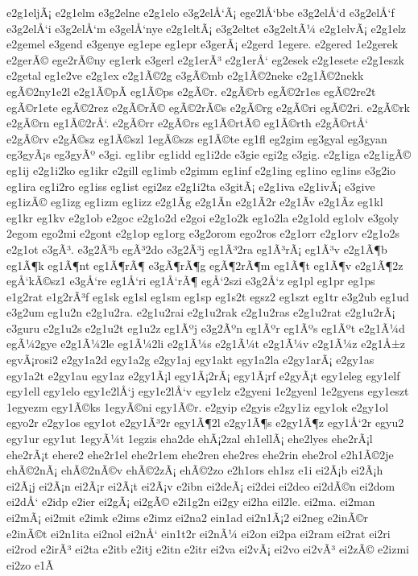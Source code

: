 {e2g1eljÃ¡
e2g1elm
e3g2elne
e2g1elo
e3g2elÅ‘Ã¡
ege2lÅ‘bbe
e3g2elÅ‘d
e3g2elÅ‘f
e3g2elÅ‘i
e3g2elÅ‘m
e3gelÅ‘nye
e2g1eltÃ¡
e3g2eltet
e3g2eltÃ¼
e2g1elvÃ¡
e2g1elz
e2gemel
e3gend
e3genye
eg1epe
eg1epr
e3gerÃ¡
e2gerd
1egere.
e2gered
1e2gerek
e2gerÃ©
ege2rÃ©ny
eg1erk
e3gerl
e2g1erÃ³
e2g1erÅ‘
eg2esek
e2g1esete
e2g1eszk
e2getal
eg1e2ve
e2g1ex
e2g1Ã©2g
e3gÃ©mb
e2g1Ã©2neke
e2g1Ã©2nekk
egÃ©2ny1e2l
e2g1Ã©pÃ­
eg1Ã©ps
e2gÃ©r.
e2gÃ©rb
egÃ©2r1es
egÃ©2re2t
egÃ©r1ete
egÃ©2rez
e2gÃ©rÃ©
egÃ©2rÃ©s
e2gÃ©rg
e2gÃ©ri
egÃ©2ri.
e2gÃ©rk
e2gÃ©rn
eg1Ã©2rÅ‘.
e2gÃ©rr
e2gÃ©rs
eg1Ã©rtÃ©
eg1Ã©rth
e2gÃ©rtÅ‘
e2gÃ©rv
e2gÃ©sz
eg1Ã©szl
1egÃ©szs
eg1Ã©te
eg1fl
eg2gim
eg3gyal
eg3gyan
eg3gyÃ¡s
eg3gyÃº
e3gi.
eg1ibr
eg1idd
eg1i2de
e3gie
egi2g
e3gig.
e2g1iga
e2g1igÃ©
eg1ij
e2g1i2ko
eg1ikr
e2gill
eg1imb
e2gimm
eg1inf
e2g1ing
eg1ino
eg1ins
e3g2io
eg1ira
eg1i2ro
eg1iss
eg1ist
egi2sz
e2g1i2ta
e3gitÃ¡
e2g1iva
e2g1ivÃ¡
e3give
eg1izÃ©
eg1izg
eg1izm
eg1izz
e2g1Ã­g
e2g1Ã­n
e2g1Ã­2r
e2g1Ã­v
e2g1Ã­z
eg1kl
eg1kr
eg1kv
e2g1ob
e2goc
e2g1o2d
e2goi
e2g1o2k
eg1o2la
e2g1old
eg1olv
e3goly
2egom
ego2mi
e2gont
e2g1op
eg1org
e3g2orom
ego2ros
e2g1orr
e2g1orv
e2g1o2s
e2g1ot
e3gÃ³.
e3g2Ã³b
egÃ³2do
e3g2Ã³j
eg1Ã³2ra
eg1Ã³rÃ¡
eg1Ã³v
e2g1Ã¶b
eg1Ã¶k
eg1Ã¶nt
eg1Ã¶rÃ¶
e3gÃ¶rÃ¶g
egÃ¶2rÃ¶m
eg1Ã¶t
eg1Ã¶v
e2g1Ã¶2z
egÅ‘kÃ©sz1
e3gÅ‘re
eg1Å‘ri
eg1Å‘rÃ¶
egÅ‘2szi
e3g2Å‘z
eg1pl
eg1pr
eg1ps
e1g2rat
e1g2rÃ³f
eg1sk
eg1sl
eg1sm
eg1sp
eg1s2t
egsz2
eg1szt
eg1tr
e3g2ub
eg1ud
e3g2um
eg1u2n
e2g1u2ra.
e2g1u2rai
e2g1u2rak
e2g1u2ras
e2g1u2rat
e2g1u2rÃ¡
e3guru
e2g1u2s
e2g1u2t
eg1u2z
eg1Ãºj
e3g2Ãºn
eg1Ãºr
eg1Ãºs
eg1Ãºt
e2g1Ã¼d
egÃ¼2gye
e2g1Ã¼2le
eg1Ã¼2li
e2g1Ã¼s
e2g1Ã¼t
e2g1Ã¼v
e2g1Ã¼z
e2g1Å±z
egvÃ¡rosi2
e2gy1a2d
egy1a2g
e2gy1aj
egy1akt
egy1a2la
e2gy1arÃ¡
e2gy1as
egy1a2t
e2gy1au
egy1az
e2gy1Ã¡l
egy1Ã¡2rÃ¡
egy1Ã¡rf
e2gyÃ¡t
egy1eleg
egy1elf
egy1ell
egy1elo
egy1e2lÅ‘j
egy1e2lÅ‘v
egy1elz
e2gyeni
1e2gyenl
1e2gyens
egy1eszt
1egyezm
egy1Ã©ks
1egyÃ©ni
egy1Ã©r.
e2gyip
e2gyis
e2gy1iz
egy1ok
e2gy1ol
egyo2r
e2gy1os
egy1ot
e2gy1Ã³2r
egy1Ã¶2l
e2gy1Ã¶s
e2gy1Ã¶z
egy1Å‘2r
egyu2
egy1ur
egy1ut
1egyÃ¼t
1egzis
eha2de
ehÃ¡2zal
eh1ellÃ¡
ehe2lyes
ehe2rÃ¡l
ehe2rÃ¡t
ehere2
ehe2r1el
ehe2r1em
ehe2ren
ehe2res
ehe2rin
ehe2rol
e2h1Ã©2je
ehÃ©2nÃ¡
ehÃ©2nÃ©v
ehÃ©2zÃ¡
ehÃ©2zo
e2h1ors
eh1sz
e1i
ei2Ã¡b
ei2Ã¡h
ei2Ã¡j
ei2Ã¡n
ei2Ã¡r
ei2Ã¡t
ei2Ã¡v
e2ibn
ei2deÃ¡
ei2dei
ei2deo
ei2dÃ©n
ei2dom
ei2dÅ‘
e2idp
e2ier
ei2gÃ¡
ei2gÃ©
e2i1g2n
ei2gy
ei2ha
eil2le.
ei2ma.
ei2man
ei2mÃ¡
ei2mit
e2imk
e2ims
e2imz
ei2na2
ein1ad
ei2n1Ã¡2
ei2neg
e2inÃ©r
e2inÃ©t
ei2n1ita
ei2nol
ei2nÅ‘
ein1t2r
ei2nÃ¼
ei2on
ei2pa
ei2ram
ei2rat
ei2ri
ei2rod
e2irÃ³
ei2ta
e2itb
e2itj
e2itn
e2itr
ei2va
ei2vÃ¡
ei2vo
ei2vÃ³
ei2zÃ©
e2izmi
ei2zo
e1Ã­
}
